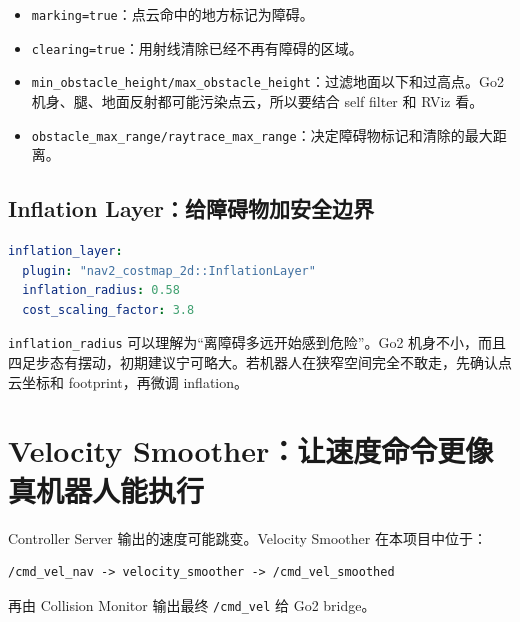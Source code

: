 \documentclass[UTF8,11pt,a4paper,openany]{ctexrep}
\newcommand{\topic}[1]{\nolinkurl{#1}}
\newcommand{\param}[1]{\nolinkurl{#1}}
\begin{document}
\begin{itemize}
  \item \param{marking=true}：点云命中的地方标记为障碍。
  \item \param{clearing=true}：用射线清除已经不再有障碍的区域。
  \item \param{min_obstacle_height/max_obstacle_height}：过滤地面以下和过高点。Go2 机身、腿、地面反射都可能污染点云，所以要结合 self filter 和 RViz 看。
  \item \param{obstacle_max_range/raytrace_max_range}：决定障碍物标记和清除的最大距离。
\end{itemize}

\subsection{Inflation Layer：给障碍物加安全边界}

\begin{lstlisting}[language=yaml]
inflation_layer:
  plugin: "nav2_costmap_2d::InflationLayer"
  inflation_radius: 0.58
  cost_scaling_factor: 3.8
\end{lstlisting}

\param{inflation_radius} 可以理解为“离障碍多远开始感到危险”。Go2 机身不小，而且四足步态有摆动，初期建议宁可略大。若机器人在狭窄空间完全不敢走，先确认点云坐标和 footprint，再微调 inflation。

\section{Velocity Smoother：让速度命令更像真机器人能执行}

Controller Server 输出的速度可能跳变。Velocity Smoother 在本项目中位于：

\begin{lstlisting}
/cmd_vel_nav -> velocity_smoother -> /cmd_vel_smoothed
\end{lstlisting}

再由 Collision Monitor 输出最终 \topic{/cmd_vel} 给 Go2 bridge。
\end{document}

